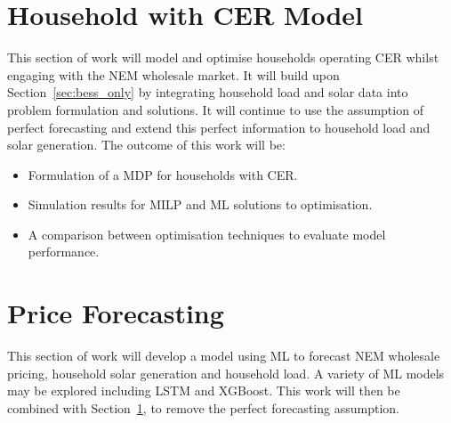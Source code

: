\section{Household with CER Model}
\label{sec:household_cer_model}
This section of work will model and optimise households operating CER whilst engaging with the NEM wholesale market. It will build upon Section~\ref{sec:bess_only} by integrating household load and solar data into problem formulation and solutions. It will continue to use the assumption of perfect forecasting and extend this perfect information to household load and solar generation. The outcome of this work will be:
\begin{itemize}
    \item Formulation of a MDP for households with CER.
    \item Simulation results for MILP and ML solutions to optimisation.
    \item A comparison between optimisation techniques to evaluate model performance.
\end{itemize}


\section{Price Forecasting}
This section of work will develop a model using ML to forecast NEM wholesale pricing, household solar generation and household load. A variety of ML models may be explored including LSTM and XGBoost. This work will then be combined with Section~\ref{sec:household_cer_model}, to remove the perfect forecasting assumption.
